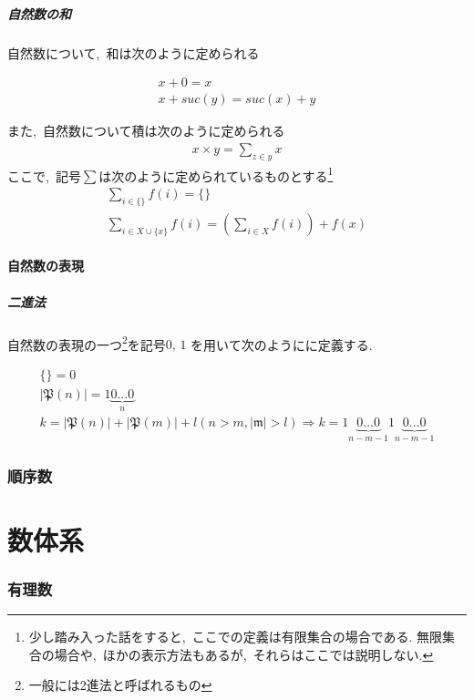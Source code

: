 \documentclass[hyperref,a4paper,12pt]{kininaruki}
\begin{document}
\subsubsection{自然数の和}
自然数について,\, 和は次のように定められる

\begin{align}
    x + 0 = x\\
    x + suc(y) = suc(x) + y
\end{align}

また,\, 自然数について積は次のように定められる
\begin{align}
    x\times y = \sum_{z\in y} x
\end{align}
ここで,\, 記号$\sum$は次のように定められているものとする\footnote{少し踏み入った話をすると,\, %
ここでの定義は有限集合の場合である.%
無限集合の場合や,\, ほかの表示方法もあるが,\, それらはここでは説明しない.}
\begin{align}
    \sum_{i\in \{\}} f(i) = \{\}\\
    \sum_{i\in X\cup\{x\}} f(i) =\left(\sum_{i \in X} f(i)\right) + f(x)
\end{align}
\subsection{自然数の表現}
\subsubsection{二進法}
自然数の表現の一つ\footnote{一般には2進法と呼ばれるもの}を記号$0,\, 1$%
を用いて次のようにに定義する.
\begin{shadebox}
    \begin{align}
        \{\} = 0\\
        |\mathfrak{P}(n)| = 1{\underbrace{0...0}_{n}}\\
        k = |\mathfrak{P}(n)| + |\mathfrak{P}(m)| + l (n>m,|\mathfrak{m}|>l)%
        \Rightarrow k = 1{\underbrace{0...0}_{n-m-1}}1{\underbrace{0...0}_{n-m-1}}
    \end{align}
\end{shadebox}
\newpage
\section{順序数}
\newpage
\part{数体系}
\section{有理数}
\newpage
\end{document}
